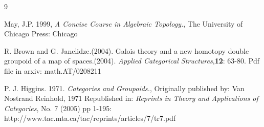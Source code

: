 \documentclass[12pt]{article}
\theoremstyle{plain}
\theoremstyle{definition}
\numberwithin{equation}{section}
\begin{document}
\begin{thebibliography} {9}

May, J.P. 1999, \emph{A Concise Course in Algebraic Topology.}, The University of Chicago Press: Chicago

R. Brown and G. Janelidze.(2004). Galois theory and a new homotopy double groupoid of a map of spaces.(2004).
{\em Applied Categorical Structures},\textbf{12}: 63-80. Pdf file in arxiv: math.AT/0208211

P. J. Higgins. 1971. \emph{Categories and Groupoids.}, Originally published by: Van Nostrand Reinhold, 1971
Republished in: \emph{Reprints in Theory and Applications of Categories}, No. 7 (2005) pp 1-195: 
http://www.tac.mta.ca/tac/reprints/articles/7/tr7.pdf




\end{thebibliography}


 





\end{document}
